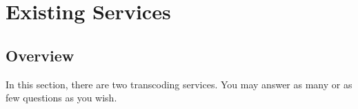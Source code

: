 \chapter{Existing Services}
\section{Overview}
In this section, there are two transcoding services. You may answer as many or as few questions as you wish. 

\clearpage

\clearpage